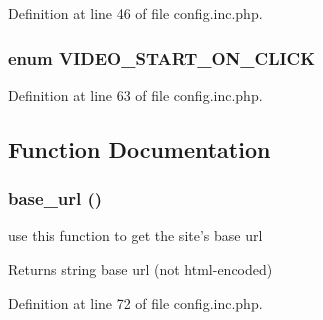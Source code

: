 Definition at line 46 of file config.inc.php.

\hypertarget{config_8inc_8php_ae1e42e1baa41f003453356a3747f9fee}{
\subsubsection[{VIDEO\_\-START\_\-ON\_\-CLICK}]{\setlength{\rightskip}{0pt plus 5cm}enum {\bf VIDEO\_\-START\_\-ON\_\-CLICK}}}
\label{config_8inc_8php_ae1e42e1baa41f003453356a3747f9fee}


Definition at line 63 of file config.inc.php.



\subsection{Function Documentation}
\hypertarget{config_8inc_8php_a8fdfb46e432b25bbdad23971a23a26b5}{
\subsubsection[{base\_\-url}]{\setlength{\rightskip}{0pt plus 5cm}base\_\-url ()}}
\label{config_8inc_8php_a8fdfb46e432b25bbdad23971a23a26b5}
use this function to get the site's base url

\begin{DoxyReturn}{Returns}
string base url (not html-\/encoded) 
\end{DoxyReturn}


Definition at line 72 of file config.inc.php.

